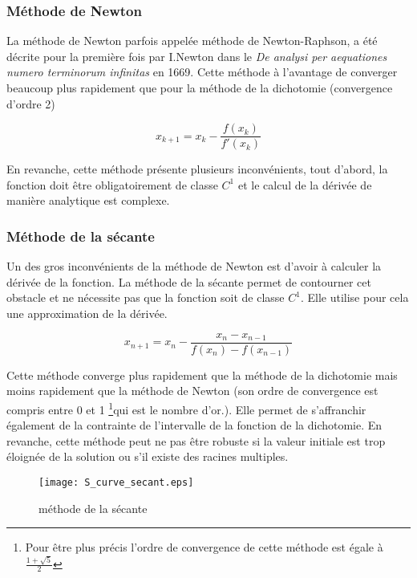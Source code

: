 \subsubsection{Méthode de Newton}
La méthode de Newton parfois appelée méthode de Newton-Raphson, a été décrite pour la première fois par I.Newton dans le \textit{De analysi per aequationes numero terminorum infinitas} en 1669. Cette méthode à l'avantage de converger beaucoup plus rapidement que pour la méthode de la dichotomie (convergence d'ordre 2)

\begin{equation}
x_{k+1} = x_k - \frac{f(x_k)}{f'(x_k)}
\end{equation}

En revanche, cette méthode présente plusieurs inconvénients, tout d'abord, la fonction doit être obligatoirement de classe $C^1$ et le calcul de la dérivée de manière analytique est complexe.


\subsubsection{Méthode de la sécante}

Un des gros inconvénients de la méthode de Newton est d'avoir à calculer la dérivée de la fonction. La méthode de la sécante permet de contourner cet obstacle et ne nécessite pas que la fonction soit de classe $C^1$. Elle utilise pour cela une approximation de la dérivée.

\begin{equation}
x_{n+1} = x_n - \frac{x_n - x_{n-1}}{f(x_n) - f(x_{n-1})}
\end{equation}

Cette méthode converge plus rapidement que la méthode de la dichotomie mais moins rapidement que la méthode de Newton (son ordre de convergence est compris entre 0 et 1 \footnote{Pour être plus précis l'ordre de convergence de cette méthode est égale à $\frac{1 + \sqrt{5}}{2}$}qui est le nombre d'or.). Elle permet de s'affranchir également de la contrainte de l'intervalle de la fonction de la dichotomie. En revanche, cette méthode peut ne pas être robuste si la valeur initiale est trop éloignée de la solution ou s'il existe des racines multiples.

\begin{figure}[htb!]
	\centering
	\texttt{[image: S\_curve\_secant.eps]}
	\caption{méthode de la sécante}
	\label{Fig::bench}
\end{figure}


